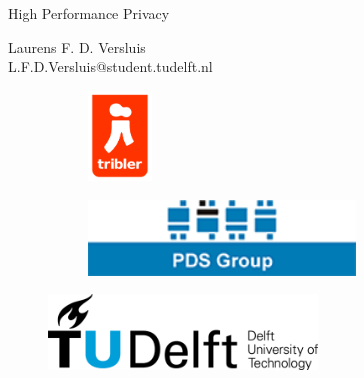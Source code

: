 \begin{titlepage}

\null\vfill

\begin{center}
\LARGE{High Performance Privacy}
\end{center}

\vspace{1.5cm}

\begin{center}
Laurens F. D. Versluis\\
L.F.D.Versluis@student.tudelft.nl
\end{center}

\vfill

\centering
\begin{figure}[!b]
\captionsetup[subfigure]{labelformat=empty}
\begin{subfigure}{0.3\textwidth}
\centering
\includegraphics[height=2.4cm]{pics/triblerlogo}
\caption{}
\end{subfigure}%
\begin{subfigure}{0.7\textwidth}
\centering
\includegraphics[height=2cm]{pics/pdslogo}
\caption{}
\end{subfigure}%
\end{figure}

\begin{figure}[!b]
\centering
\includegraphics[height=2cm]{pics/TUDLogo}
\end{figure}


\vspace{2.0cm}

\end{titlepage}
